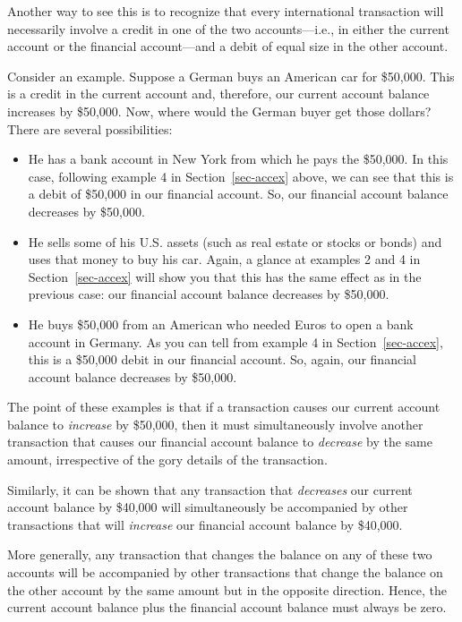 \documentclass[
  letterpaper,
]{book}
\providecommand{\tightlist}{%
  \setlength{\itemsep}{0pt}\setlength{\parskip}{0pt}}\usepackage{longtable,booktabs,array}
\begin{document}
Another way to see this is to recognize that every international
transaction will necessarily involve a credit in one of the two
accounts---i.e., in either the current account or the financial
account---and a debit of equal size in the other account.

Consider an example. Suppose a German buys an American car for \$50,000.
This is a credit in the current account and, therefore, our current
account balance increases by \$50,000. Now, where would the German buyer
get those dollars? There are several possibilities:

\begin{itemize}
\tightlist
\item
  He has a bank account in New York from which he pays the \$50,000. In
  this case, following example 4 in Section~\ref{sec-accex} above, we
  can see that this is a debit of \$50,000 in our financial account. So,
  our financial account balance decreases by \$50,000.
\item
  He sells some of his U.S. assets (such as real estate or stocks or
  bonds) and uses that money to buy his car. Again, a glance at examples
  2 and 4 in Section~\ref{sec-accex} will show you that this has the
  same effect as in the previous case: our financial account balance
  decreases by \$50,000.
\item
  He buys \$50,000 from an American who needed Euros to open a bank
  account in Germany. As you can tell from example 4 in
  Section~\ref{sec-accex}, this is a \$50,000 debit in our financial
  account. So, again, our financial account balance decreases by
  \$50,000.
\end{itemize}

The point of these examples is that if a transaction causes our current
account balance to \emph{increase} by \$50,000, then it must
simultaneously involve another transaction that causes our financial
account balance to \emph{decrease} by the same amount, irrespective of
the gory details of the transaction.

Similarly, it can be shown that any transaction that \emph{decreases}
our current account balance by \$40,000 will simultaneously be
accompanied by other transactions that will \emph{increase} our
financial account balance by \$40,000.

More generally, any transaction that changes the balance on any of these
two accounts will be accompanied by other transactions that change the
balance on the other account by the same amount but in the opposite
direction. Hence, the current account balance plus the financial account
balance must always be zero.
\end{document}
